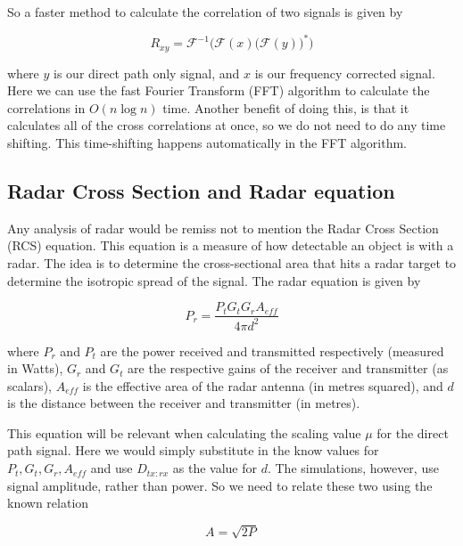 \documentclass[12pt,openany,a4paper]{book}
\begin{document}
\bigskip

So a faster method to calculate the correlation of two signals is given by

\begin{equation}
R_{xy} = \mathcal{F}^{-1} \Bigg( \mathcal{F}(x) \bigg(\mathcal{F}(y)\bigg)^* \Bigg)
\end{equation}

\bigskip

where $y$ is our direct path only signal, and $x$ is our frequency corrected signal. Here we can use the fast Fourier Transform (FFT) algorithm to calculate the correlations in $O (n \log n)$ time. Another benefit of doing this, is that it calculates all of the cross correlations at once, so we do not need to do any time shifting. This time-shifting happens automatically in the FFT algorithm.

\subsection{Radar Cross Section and Radar equation}
\label{sec:RCSeqn}
Any analysis of radar would be remiss not to mention the Radar Cross Section (RCS) equation. This equation is a measure of how detectable an object is with a radar. The idea is to determine the cross-sectional area that hits a radar target to determine the isotropic spread of the signal. The radar equation is given by

\begin{equation}
\label{eqn:rcs1}
P_r = \frac{P_tG_tG_rA_{eff}}{4\pi d^2}
\end{equation}

\bigskip

where $P_r$ and $P_t$ are the power received and transmitted respectively (measured in Watts), $G_r$ and $G_t$ are the respective gains of the receiver and transmitter (as scalars), $A_{eff}$ is the effective area of the radar antenna (in metres squared), and $d$ is the distance between the receiver and transmitter (in metres).

\bigskip

This equation will be relevant when calculating the scaling value $\mu$ for the direct path signal. Here we would simply substitute in the know values for $P_t,G_t,G_r,A_{eff}$ and use $D_{tx\colon rx}$ as the value for $d$. The simulations, however, use signal amplitude, rather than power. So we need to relate these two using the known relation

\begin{equation}
A = \sqrt{2P}
\end{equation}
\end{document}

